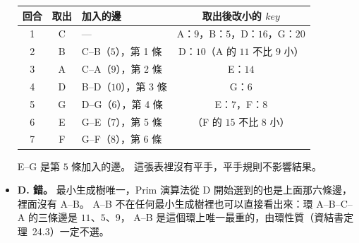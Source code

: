 \begin{pastsoln}
\begin{itemize}
\begin{center}
\small
\begin{tabular}{cclc}
\toprule
回合 & 取出 & 加入的邊 & 取出後改小的 $\mathit{key}$ \\
\midrule
1 & C & — & A：$9$，B：$5$，D：$16$，G：$20$ \\
2 & B & C--B（$5$），第 1 條 & D：$10$（A 的 $11$ 不比 $9$ 小） \\
3 & A & C--A（$9$），第 2 條 & E：$14$ \\
4 & D & B--D（$10$），第 3 條 & G：$6$ \\
5 & G & D--G（$6$），第 4 條 & E：$7$，F：$8$ \\
6 & E & G--E（$7$），第 5 條 & （F 的 $15$ 不比 $8$ 小） \\
7 & F & G--F（$8$），第 6 條 & \\
\bottomrule
\end{tabular}
\end{center}

E--G 是第 $5$ 條加入的邊。 這張表裡沒有平手，平手規則不影響結果。
\item \textbf{D. 錯。} 最小生成樹唯一，Prim 演算法從 D 開始選到的也是上面那六條邊，裡面沒有
A--B。 A--B 不在任何最小生成樹裡也可以直接看出來：環 A--B--C--A 的三條邊是 $11$、$5$、$9$，
A--B 是這個環上唯一最重的，由環性質（資結書定理~24.3）一定不選。
\end{itemize}
\end{pastsoln}
